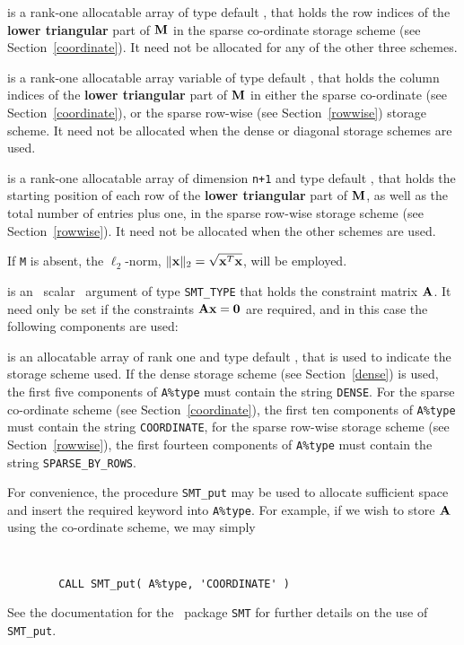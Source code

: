 \documentclass{galahad}
\begin{document}
\begin{description}
\begin{description}
 is a rank-one allocatable array of type default \integer,
that holds the row indices of the {\bf lower triangular} part of ${\mathbf{M}}$
in the sparse co-ordinate storage
scheme (see Section~\ref{coordinate}).
It need not be allocated for any of the other three schemes.

 is a rank-one allocatable array variable of type default \integer,
that holds the column indices of the {\bf lower triangular} part of
${\mathbf{M}}$ in either the sparse co-ordinate
(see Section~\ref{coordinate}), or the sparse row-wise
(see Section~\ref{rowwise}) storage scheme.
It need not be allocated when the dense or diagonal storage schemes are used.

 is a rank-one allocatable array of dimension {\tt n+1} and type
default \integer, that holds the starting position of
each row of the {\bf lower triangular} part of ${\mathbf{M}}$, as well
as the total number of entries plus one, in the sparse row-wise storage
scheme (see Section~\ref{rowwise}). It need not be allocated when the
other schemes are used.

\end{description}
If {\tt M} is absent, the $\ell_2$-norm, $\|{\mathbf{x}}\|_2 = \sqrt{{\mathbf{x}}^T {\mathbf{x}}}$,
will be employed.

 is an \optional\ scalar \intentin\ argument of type {\tt SMT\_TYPE}
that holds the constraint matrix ${\mathbf{A}}$. It need only be set
if the constraints ${\mathbf{A}} {\mathbf{x}} = {\mathbf{0}}$ are required,
and in this case the following components are used:

\begin{description}

 is an allocatable array of rank one and type default
\character, that
is used to indicate the storage scheme used. If the dense storage scheme
(see Section~\ref{dense}) is used,
the first five components of {\tt A\%type} must contain the
string {\tt DENSE}.
For the sparse co-ordinate scheme (see Section~\ref{coordinate}),
the first ten components of {\tt A\%type} must contain the
string {\tt COORDINATE},
for the sparse row-wise storage scheme (see Section~\ref{rowwise}),
the first fourteen components of {\tt A\%type} must contain the
string {\tt SPARSE\_BY\_ROWS}.

For convenience, the procedure {\tt SMT\_put}
may be used to allocate sufficient space and insert the required keyword
into {\tt A\%type}.
For example, if we wish to store ${\mathbf{A}}$ using the co-ordinate scheme,
we may simply
{\tt
\begin{verbatim}
        CALL SMT_put( A%type, 'COORDINATE' )
\end{verbatim}
}
\noindent
See the documentation for the \galahad\ package {\tt SMT}
for further details on the use of {\tt SMT\_put}.


\end{description}
\end{description}
\end{document}
